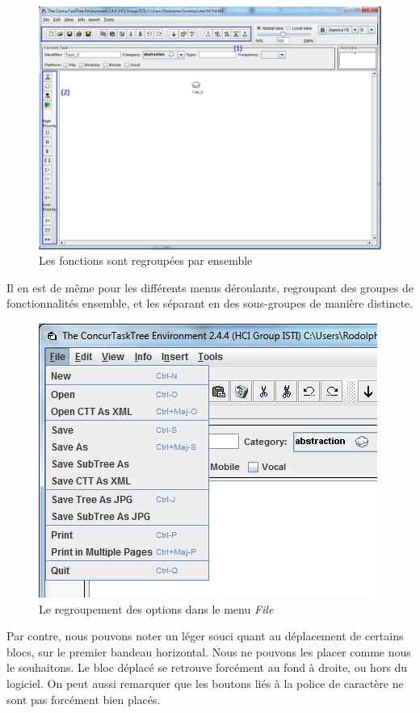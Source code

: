 \documentclass[12pt, a4paper]{article}
\begin{document}
\begin{figure}[h]
\begin{center}
   \includegraphics[scale = 0.5]{groupement.jpg}
	\caption{Les fonctions sont regroupées par ensemble}
	\end{center}
\end{figure}
Il en est de même pour les différents menus déroulants, regroupant des groupes de fonctionnalités ensemble, et les séparant en des sous-groupes de manière distincte.
\begin{figure}[h]
\begin{center}
   \includegraphics[scale = 0.5]{menusderoulant.jpg}
	\caption{Le regroupement des options dans le menu \emph{File}}
	\end{center}
\end{figure}

\newpage
Par contre, nous pouvons noter un léger souci quant au déplacement de certains blocs, sur le premier bandeau horizontal. Nous ne pouvons les placer comme nous le souhaitons. Le bloc déplacé se retrouve forcément au fond à droite, ou hors du logiciel. On peut aussi remarquer que les boutons liés à la police de caractère ne sont pas forcément bien placés.\\ 
\end{document}
